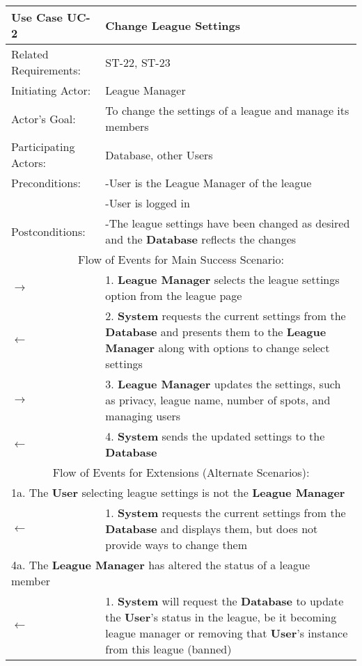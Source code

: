 \begin{centering}
\renewcommand\arraystretch{1.3} %
\label{UC-2}
\begin{longtable}{|p{1.2in} p{5in}|}
\hline

\bfseries{\color{color1}Use Case UC-2} & \bfseries{\color{color1}Change League Settings} \\
\hline
Related Requirements: & ST-22, ST-23\\ 
Initiating Actor:     & League Manager \\
Actor's Goal:         & To change the settings of a league and manage its members \\
Participating Actors:  & Database, other Users \\
Preconditions:        & -User is the League Manager of the league \\
 & -User is logged in \\
Postconditions:       & -The league settings have been changed as desired and the \textbf{Database} reflects the changes \\
\hline
\multicolumn{2}{|c|}{\color{color1}Flow of Events for Main Success Scenario:}\\
\hline
$\rightarrow$ & 1. \textbf{League Manager} selects the league settings option from the league page \\
$\leftarrow$ & 2. \textbf{System} requests the current settings from the \textbf{Database} and presents them to the \textbf{League Manager} along with options to change select settings \\
$\rightarrow$ & 3. \textbf{League Manager} updates the settings, such as privacy, league name, number of spots, and managing users \\
$\leftarrow$ & 4. \textbf{System} sends the updated settings to the \textbf{Database} \\
\hline
\multicolumn{2}{|c|}{\color{color1}Flow of Events for Extensions (Alternate Scenarios):} \\
\hline
\multicolumn{2}{|p{6.2in}|}{1a. The \textbf{User} selecting league settings is not the \textbf{League Manager}} \\
\hline
$\leftarrow$ & 1. \textbf{System} requests the current settings from the \textbf{Database} and displays them, but does not provide ways to change them \\
\hline
\multicolumn{2}{|p{6.2in}|}{4a. The \textbf{League Manager} has altered the status of a league member} \\
\hline
$\leftarrow$ & 1. \textbf{System} will request the \textbf{Database} to update the \textbf{User}'s status in the league, be it becoming league manager or removing that \textbf{User}'s instance from this league (banned)\\
\hline
\end{longtable}
\end{centering}

